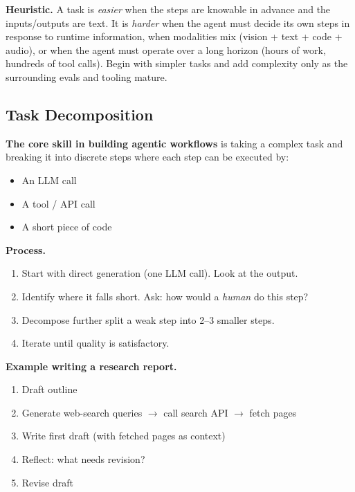 \documentclass[a4paper,11pt]{article}
\begin{document}
\begin{ambercallout}
\textbf{Heuristic.} A task is \textit{easier} when the steps are
knowable in advance and the inputs/outputs are text. It is
\textit{harder} when the agent must decide its own steps in response
to runtime information, when modalities mix (vision + text + code +
audio), or when the agent must operate over a long horizon (hours of
work, hundreds of tool calls). Begin with simpler tasks and add
complexity only as the surrounding evals and tooling mature.
\end{ambercallout}

\subsection{Task Decomposition}

\textbf{The core skill in building agentic workflows} is taking a
complex task and breaking it into discrete steps where each step can
be executed by:

\begin{itemize}[noitemsep, leftmargin=1.2em]
  \item An LLM call
  \item A tool / API call
  \item A short piece of code
\end{itemize}

\textbf{Process.}
\begin{enumerate}[noitemsep, leftmargin=1.4em]
  \item Start with direct generation (one LLM call). Look at the
        output.
  \item Identify where it falls short. Ask: how would a \textit{human}
        do this step?
  \item Decompose further \textemdash{} split a weak step into 2–3
        smaller steps.
  \item Iterate until quality is satisfactory.
\end{enumerate}

\textbf{Example \textemdash{} writing a research report.}
\begin{enumerate}[noitemsep, leftmargin=1.4em]
  \item Draft outline
  \item Generate web-search queries $\to$ call search API $\to$ fetch
        pages
  \item Write first draft (with fetched pages as context)
  \item Reflect: what needs revision?
  \item Revise draft
\end{enumerate}
\end{document}
